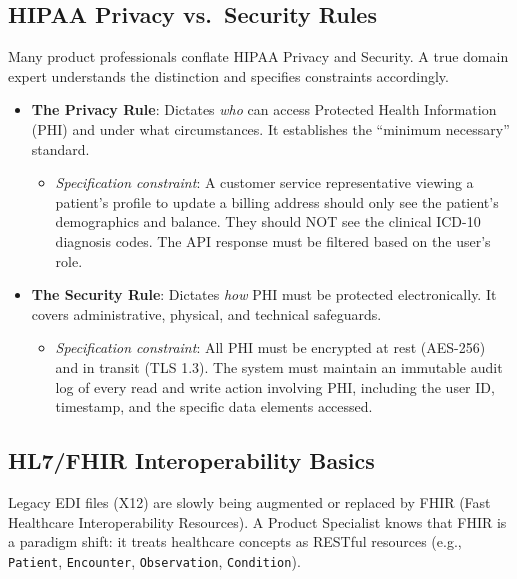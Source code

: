 \subsection{HIPAA Privacy vs.~Security
Rules}\label{hipaa-privacy-vs.-security-rules}

Many product professionals conflate HIPAA Privacy and Security. A true
domain expert understands the distinction and specifies constraints
accordingly.

\begin{itemize}
\tightlist
\item
  \textbf{The Privacy Rule}: Dictates \emph{who} can access Protected
  Health Information (PHI) and under what circumstances. It establishes
  the ``minimum necessary'' standard.

  \begin{itemize}
  \tightlist
  \item
    \emph{Specification constraint}: A customer service representative
    viewing a patient's profile to update a billing address should only
    see the patient's demographics and balance. They should NOT see the
    clinical ICD-10 diagnosis codes. The API response must be filtered
    based on the user's role.
  \end{itemize}
\item
  \textbf{The Security Rule}: Dictates \emph{how} PHI must be protected
  electronically. It covers administrative, physical, and technical
  safeguards.

  \begin{itemize}
  \tightlist
  \item
    \emph{Specification constraint}: All PHI must be encrypted at rest
    (AES-256) and in transit (TLS 1.3). The system must maintain an
    immutable audit log of every read and write action involving PHI,
    including the user ID, timestamp, and the specific data elements
    accessed.
  \end{itemize}
\end{itemize}

\subsection{HL7/FHIR Interoperability
Basics}\label{hl7fhir-interoperability-basics}

Legacy EDI files (X12) are slowly being augmented or replaced by FHIR
(Fast Healthcare Interoperability Resources). A Product Specialist knows
that FHIR is a paradigm shift: it treats healthcare concepts as RESTful
resources (e.g., \texttt{Patient}, \texttt{Encounter},
\texttt{Observation}, \texttt{Condition}).

